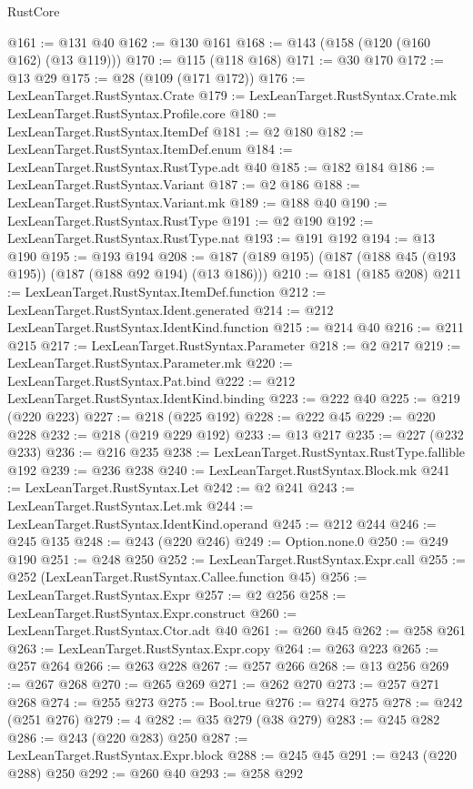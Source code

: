 \begin{lexlean}{RustCore}
\begin{coremodule}
@161 := @131 @40
@162 := @130 @161
@168 := @143 (@158 (@120 (@160 @162) (@13 @119)))
@170 := @115 (@118 @168)
@171 := @30 @170
@172 := @13 @29
@175 := @28 (@109 (@171 @172))
@176 := LexLeanTarget.RustSyntax.Crate
@179 := LexLeanTarget.RustSyntax.Crate.mk LexLeanTarget.RustSyntax.Profile.core
@180 := LexLeanTarget.RustSyntax.ItemDef
@181 := @2 @180
@182 := LexLeanTarget.RustSyntax.ItemDef.enum
@184 := LexLeanTarget.RustSyntax.RustType.adt @40
@185 := @182 @184
@186 := LexLeanTarget.RustSyntax.Variant
@187 := @2 @186
@188 := LexLeanTarget.RustSyntax.Variant.mk
@189 := @188 @40
@190 := LexLeanTarget.RustSyntax.RustType
@191 := @2 @190
@192 := LexLeanTarget.RustSyntax.RustType.nat
@193 := @191 @192
@194 := @13 @190
@195 := @193 @194
@208 := @187 (@189 @195) (@187 (@188 @45 (@193 @195)) (@187 (@188 @92 @194) (@13 @186)))
@210 := @181 (@185 @208)
@211 := LexLeanTarget.RustSyntax.ItemDef.function
@212 := LexLeanTarget.RustSyntax.Ident.generated
@214 := @212 LexLeanTarget.RustSyntax.IdentKind.function
@215 := @214 @40
@216 := @211 @215
@217 := LexLeanTarget.RustSyntax.Parameter
@218 := @2 @217
@219 := LexLeanTarget.RustSyntax.Parameter.mk
@220 := LexLeanTarget.RustSyntax.Pat.bind
@222 := @212 LexLeanTarget.RustSyntax.IdentKind.binding
@223 := @222 @40
@225 := @219 (@220 @223)
@227 := @218 (@225 @192)
@228 := @222 @45
@229 := @220 @228
@232 := @218 (@219 @229 @192)
@233 := @13 @217
@235 := @227 (@232 @233)
@236 := @216 @235
@238 := LexLeanTarget.RustSyntax.RustType.fallible @192
@239 := @236 @238
@240 := LexLeanTarget.RustSyntax.Block.mk
@241 := LexLeanTarget.RustSyntax.Let
@242 := @2 @241
@243 := LexLeanTarget.RustSyntax.Let.mk
@244 := LexLeanTarget.RustSyntax.IdentKind.operand
@245 := @212 @244
@246 := @245 @135
@248 := @243 (@220 @246)
@249 := Option.none.{0}
@250 := @249 @190
@251 := @248 @250
@252 := LexLeanTarget.RustSyntax.Expr.call
@255 := @252 (LexLeanTarget.RustSyntax.Callee.function @45)
@256 := LexLeanTarget.RustSyntax.Expr
@257 := @2 @256
@258 := LexLeanTarget.RustSyntax.Expr.construct
@260 := LexLeanTarget.RustSyntax.Ctor.adt @40
@261 := @260 @45
@262 := @258 @261
@263 := LexLeanTarget.RustSyntax.Expr.copy
@264 := @263 @223
@265 := @257 @264
@266 := @263 @228
@267 := @257 @266
@268 := @13 @256
@269 := @267 @268
@270 := @265 @269
@271 := @262 @270
@273 := @257 @271 @268
@274 := @255 @273
@275 := Bool.true
@276 := @274 @275
@278 := @242 (@251 @276)
@279 := 4
@282 := @35 @279 (@38 @279)
@283 := @245 @282
@286 := @243 (@220 @283) @250
@287 := LexLeanTarget.RustSyntax.Expr.block
@288 := @245 @45
@291 := @243 (@220 @288) @250
@292 := @260 @40
@293 := @258 @292

\end{coremodule}
\end{lexlean}
